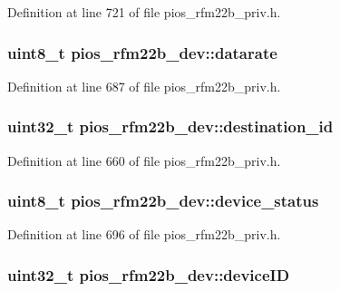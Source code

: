 \-Definition at line 721 of file pios\-\_\-rfm22b\-\_\-priv.\-h.

\hypertarget{structpios__rfm22b__dev_aff7a6133350534d9bdb99e8e4856dd6e}{
\subsubsection[{datarate}]{\setlength{\rightskip}{0pt plus 5cm}uint8\-\_\-t {\bf pios\-\_\-rfm22b\-\_\-dev\-::datarate}}}\label{structpios__rfm22b__dev_aff7a6133350534d9bdb99e8e4856dd6e}


\-Definition at line 687 of file pios\-\_\-rfm22b\-\_\-priv.\-h.

\hypertarget{structpios__rfm22b__dev_ada47e039e7ba782c44b154fce01005eb}{
\subsubsection[{destination\-\_\-id}]{\setlength{\rightskip}{0pt plus 5cm}uint32\-\_\-t {\bf pios\-\_\-rfm22b\-\_\-dev\-::destination\-\_\-id}}}\label{structpios__rfm22b__dev_ada47e039e7ba782c44b154fce01005eb}


\-Definition at line 660 of file pios\-\_\-rfm22b\-\_\-priv.\-h.

\hypertarget{structpios__rfm22b__dev_aa6ea2086a901b33a1f0f1535f378cdfc}{
\subsubsection[{device\-\_\-status}]{\setlength{\rightskip}{0pt plus 5cm}uint8\-\_\-t {\bf pios\-\_\-rfm22b\-\_\-dev\-::device\-\_\-status}}}\label{structpios__rfm22b__dev_aa6ea2086a901b33a1f0f1535f378cdfc}


\-Definition at line 696 of file pios\-\_\-rfm22b\-\_\-priv.\-h.

\hypertarget{structpios__rfm22b__dev_ac608ccb62cbd144c8053aaacb8c14fcf}{
\subsubsection[{device\-I\-D}]{\setlength{\rightskip}{0pt plus 5cm}uint32\-\_\-t {\bf pios\-\_\-rfm22b\-\_\-dev\-::device\-I\-D}}}\label{structpios__rfm22b__dev_ac608ccb62cbd144c8053aaacb8c14fcf}


